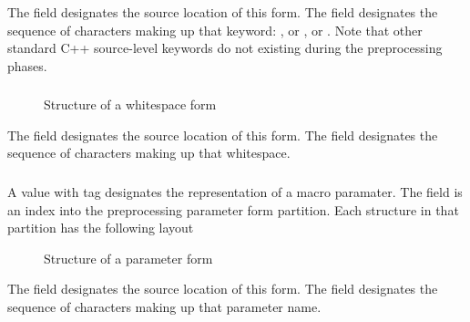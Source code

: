 The field  designates the source location of this form.  The
field  designates the sequence of characters making up that 
keyword: , or , or
.  Note that other standard C++ source-level keywords do
not existing during the preprocessing phases.


\subsubsection{}
\label{sec:ifc:FormSort:Whitespace}

\begin{figure}[H]
  \centering
  \caption{Structure of a whitespace form}
  \label{fig:ifc-whitespace-form}
\end{figure}

The field  designates the source location of this form.  The
field  designates the sequence of characters making up that 
whitespace.



\subsubsection{}
\label{sec:ifc:FormSort:Parameter}

A  value with tag  designates
the representation of a macro paramater.
The  field is an index into
the preprocessing parameter form partition.  Each structure in that partition
has the following layout
%
\begin{figure}[H]
  \centering
  \caption{Structure of a parameter form}
  \label{fig:ifc-parameter-form}
\end{figure}

The field  designates the source location of this form.  The
field  designates the sequence of characters making up that 
parameter name.

